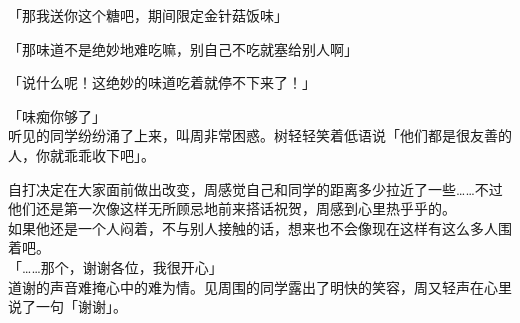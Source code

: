 「那我送你这个糖吧，期间限定金针菇饭味」

「那味道不是绝妙地难吃嘛，别自己不吃就塞给别人啊」

「说什么呢！这绝妙的味道吃着就停不下来了！」

「味痴你够了」\\

听见的同学纷纷涌了上来，叫周非常困惑。树轻轻笑着低语说「他们都是很友善的人，你就乖乖收下吧」。

自打决定在大家面前做出改变，周感觉自己和同学的距离多少拉近了一些……不过他们还是第一次像这样无所顾忌地前来搭话祝贺，周感到心里热乎乎的。\\

如果他还是一个人闷着，不与别人接触的话，想来也不会像现在这样有这么多人围着吧。\\

「……那个，谢谢各位，我很开心」\\

道谢的声音难掩心中的难为情。见周围的同学露出了明快的笑容，周又轻声在心里说了一句「谢谢」。
